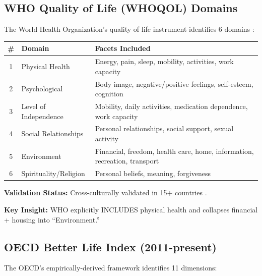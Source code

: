 \subsection{WHO Quality of Life (WHOQOL) Domains}

The World Health Organization's quality of life instrument identifies 6 domains \citep{whoqol1995world}:

\begin{center}
\begin{tabular}{@{}clp{6cm}@{}}
\toprule
\textbf{\#} & \textbf{Domain} & \textbf{Facets Included} \\
\midrule
1 & Physical Health & Energy, pain, sleep, mobility, activities, work capacity \\
2 & Psychological & Body image, negative/positive feelings, self-esteem, cognition \\
3 & Level of Independence & Mobility, daily activities, medication dependence, work capacity \\
4 & Social Relationships & Personal relationships, social support, sexual activity \\
5 & Environment & Financial, freedom, health care, home, information, recreation, transport \\
6 & Spirituality/Religion & Personal beliefs, meaning, forgiveness \\
\bottomrule
\end{tabular}
\end{center}

\textbf{Validation Status:} Cross-culturally validated in 15+ countries \citep{skevington2004quality}.

\textbf{Key Insight:} WHO explicitly INCLUDES physical health and collapses financial + housing into ``Environment.''

\subsection{OECD Better Life Index (2011-present)}

The OECD's empirically-derived framework identifies 11 dimensions:

